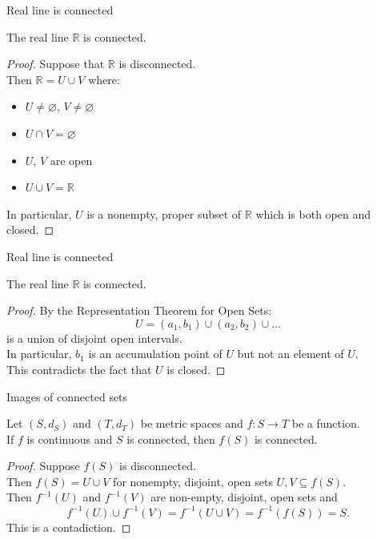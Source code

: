 \documentclass{beamer}
\begin{document}
\begin{frame}{Real line is connected}
\begin{thm}
The real line $\mathbb{R}$ is connected.
\end{thm}
\pause
\begin{proof}
\pause
Suppose that $\mathbb{R}$ is disconnected.\\
\pause
Then $\mathbb{R} = U\cup V$ where:
\begin{itemize}
\pause
\item $U\neq\varnothing$, $V\neq\varnothing$
\pause
\item $U\cap V = \varnothing$
\pause
\item $U$, $V$ are open
\pause
\item $U\cup V = \mathbb{R}$
\end{itemize}
\pause
In particular, $U$ is a nonempty, proper subset of $\mathbb{R}$ which is both open and closed.
\end{proof}
\end{frame}

\begin{frame}{Real line is connected}
\begin{thm}
The real line $\mathbb{R}$ is connected.
\end{thm}
\pause
\begin{proof}
\pause
By the Representation Theorem for Open Sets:
\pause
$$U = (a_1,b_1)\cup (a_2,b_2)\cup\dots $$
\pause
is a union of disjoint open intervals.\\
\pause
In particular, $b_1$ is an accumulation point of $U$ but not an element of $U$.\\
\pause
This contradicts the fact that $U$ is closed.
\end{proof}
\end{frame}

\begin{frame}{Images of connected sets}
\begin{thm}
Let $(S,d_S)$ and $(T,d_T)$ be metric spaces and $f: S\rightarrow T$ be a function.\\
If $f$ is continuous and $S$ is connected, then $f(S)$ is connected.
\end{thm}
\pause
\begin{proof}
\pause
Suppose $f(S)$ is disconnected.\\
\pause
Then $f(S) = U\cup V$ for nonempty, disjoint, open sets $U,V\subseteq f(S)$.\\
\pause
Then $f^{-1}(U)$ and $f^{-1}(V)$ are non-empty, disjoint, open sets and
$$f^{-1}(U)\cup f^{-1}(V) = f^{-1}(U\cup V) = f^{-1}(f(S)) = S.$$
\pause
This is a contadiction.
\end{proof}
\end{frame}
\end{document}
